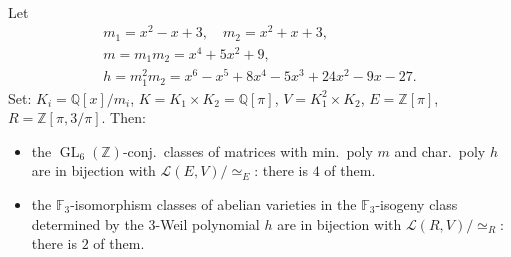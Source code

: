 \documentclass[aspectratio=169,usenames,dvipsnames]{beamer}
\def\Q{\mathbb{Q}}
\def\Z{\mathbb{Z}}
\def\F{\mathbb{F}}
\DeclareMathOperator{\GL}{GL}
\newcommand{\cL}{{\mathcal L}}
\begin{document}
\begin{frame}{}\
   \begin{example}
      Let
      \begin{gather*}
         m_1 =x^2 - x + 3, \quad
         m_2 = x^2 + x + 3,\\
         m = m_1m_2 = x^4 +5x^2 + 9, \\
         h =m_1^2m_2 = x^6 - x^5 + 8x^4 -5x^3 + 24x^2 - 9x - 27.
      \end{gather*}
      \pause
      Set: $K_i=\Q[x]/m_i$, $K=K_1\times K_2=\Q[\pi]$, $V=K_1^2\times K_2$, $E=\Z[\pi]$, $R=\Z[\pi,3/\pi]$.
      \pause
      Then:
      \begin{itemize}
            \item the $\GL_6(\Z)$-conj.~classes of matrices with min.~poly $m$ and char.~poly $h$ are in bijection with $\cL(E,V)/\simeq_E$: there is $4$ of them.
      \pause
            \item the $\F_3$-isomorphism classes of abelian varieties in the $\F_3$-isogeny class determined by the $3$-Weil polynomial $h$ are in bijection with $\cL(R,V)/\simeq_R$: there is $2$ of them.
      \end{itemize}
   \end{example}
\end{frame}

\end{document}
